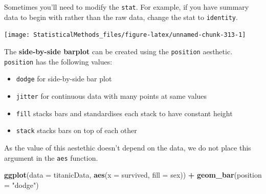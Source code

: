 \documentclass[
]{book}
\newenvironment{Shaded}{\begin{snugshade}}{\end{snugshade}}
\newcommand{\DataTypeTok}[1]{\textcolor[rgb]{0.13,0.29,0.53}{#1}}
\newcommand{\KeywordTok}[1]{\textcolor[rgb]{0.13,0.29,0.53}{\textbf{#1}}}
\newcommand{\NormalTok}[1]{#1}
\newcommand{\OperatorTok}[1]{\textcolor[rgb]{0.81,0.36,0.00}{\textbf{#1}}}
\newcommand{\StringTok}[1]{\textcolor[rgb]{0.31,0.60,0.02}{#1}}
\providecommand{\tightlist}{%
  \setlength{\itemsep}{0pt}\setlength{\parskip}{0pt}}
\theoremstyle{definition}
\theoremstyle{definition}
\theoremstyle{definition}
\theoremstyle{remark}
\begin{document}
Sometimes you'll need to modify the \texttt{stat}. For example, if you have summary data to begin with rather than the raw data, change the stat to \texttt{identity}.

\begin{Shaded}
\end{Shaded}

\begin{center}\texttt{[image: StatisticalMethods\_files/figure-latex/unnamed-chunk-313-1]} \end{center}

The \textbf{side-by-side barplot} can be created using the \texttt{position} aesthetic. \texttt{position} has the following values:

\begin{itemize}
\tightlist
\item
  \texttt{dodge} for side-by-side bar plot\\
\item
  \texttt{jitter} for continuous data with many points at same values\\
\item
  \texttt{fill} stacks bars and standardises each stack to have constant height\\
\item
  \texttt{stack} stacks bars on top of each other
\end{itemize}

As the value of this aestethic doesn't depend on the data, we do not place this argument in the \texttt{aes} function.

\begin{Shaded}
\begin{Highlighting}[]
\KeywordTok{ggplot}\NormalTok{(}\DataTypeTok{data =}\NormalTok{ titanicData, }\KeywordTok{aes}\NormalTok{(}\DataTypeTok{x =}\NormalTok{ survived, }\DataTypeTok{fill =}\NormalTok{ sex)) }\OperatorTok{+}\StringTok{ }
\StringTok{  }\KeywordTok{geom_bar}\NormalTok{(}\DataTypeTok{position =} \StringTok{"dodge"}\NormalTok{)}
\end{Highlighting}
\end{Shaded}
\end{document}
